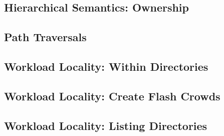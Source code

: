 \subsection{Hierarchical Semantics: Ownership}
\subsection{Path Traversals}

\subsection{Workload Locality: Within Directories}
\subsection{Workload Locality: Create Flash Crowds}
\subsection{Workload Locality: Listing Directories}
